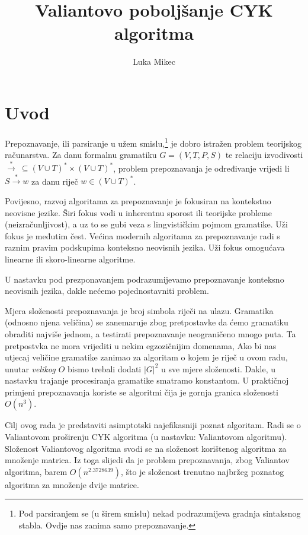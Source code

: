 \documentclass[a4paper,oneside,12pt]{article} %
\title{Valiantovo poboljšanje CYK algoritma}
\author{Luka Mikec}
\begin{document}
    \maketitle

    \section{Uvod}
    Prepoznavanje, ili parsiranje u užem smislu,\footnote{Pod parsiranjem se (u širem smislu) nekad
        podrazumijeva gradnja sintaksnog stabla. Ovdje nas zanima samo prepoznavanje. } 
        je dobro istražen problem teorijskog računarstva.
    Za danu formalnu gramatiku $G = (V, T, P, S)$ 
        te relaciju izvodivosti
        $\xrightarrow{*}\ \subseteq (V \cup T)^* \times (V \cup T)^*$,
        problem prepoznavanja je određivanje vrijedi li $S \xrightarrow{*} w$
        za danu riječ $w \in (V \cup T)^*$.

   Povijesno, razvoj algoritama za prepoznavanje je fokusiran na kontekstno neovisne jezike.
   Širi fokus vodi u inherentnu sporost ili teorijske probleme (neizračunljivost),
       a uz to se gubi veza s lingvističkim pojmom gramatike.
   Uži fokus je međutim čest. Većina modernih algoritama za prepoznavanje radi s
       raznim pravim podskupima konteksno neovisnih jezika.
   Uži fokus omogućava linearne ili skoro-linearne algoritme.
   
   U nastavku pod prezponavanjem podrazumijevamo prepoznavanje konteksno neovisnih jezika,
       dakle nećemo pojednostavniti problem.
   
   Mjera složenosti prepoznavanja je broj simbola riječi na ulazu.
   Gramatika (odnosno njena veličina) se zanemaruje zbog pretpostavke da 
       ćemo gramatiku obraditi najviše jednom,
       a testirati prepoznavanje neograničeno mnogo puta.
   Ta pretpostvka ne mora vrijediti u nekim egzozičnijim domenama,
   Ako bi nas utjecaj veličine gramatike zanimao za algoritam o kojem je riječ u ovom radu, 
       unutar \emph{velikog $O$} bismo trebali dodati $|G|^2$ u sve mjere složenosti.
   Dakle, u nastavku trajanje procesiranja gramatike smatramo konstantom.
   U praktičnoj primjeni prepoznavanja koriste se algoritmi čija je gornja granica složenosti $O(n^3)$.
   
   Cilj ovog rada je predstaviti asimptotski najefikasniji poznat algoritam.
   Radi se o Valiantovom proširenju CYK algoritma (u nastavku: Valiantovom algoritmu).
   Složenost Valiantovog algoritma svodi se na složenost korištenog algoritma za množenje matrica.
   Iz toga slijedi da je problem prepoznavanja,
       zbog Valiantov algoritma,
       barem $O(n^{2.3728639})$, što je složenost trenutno najbržeg poznatog 
       algoritma za množenje dvije matrice.
    
\end{document}
